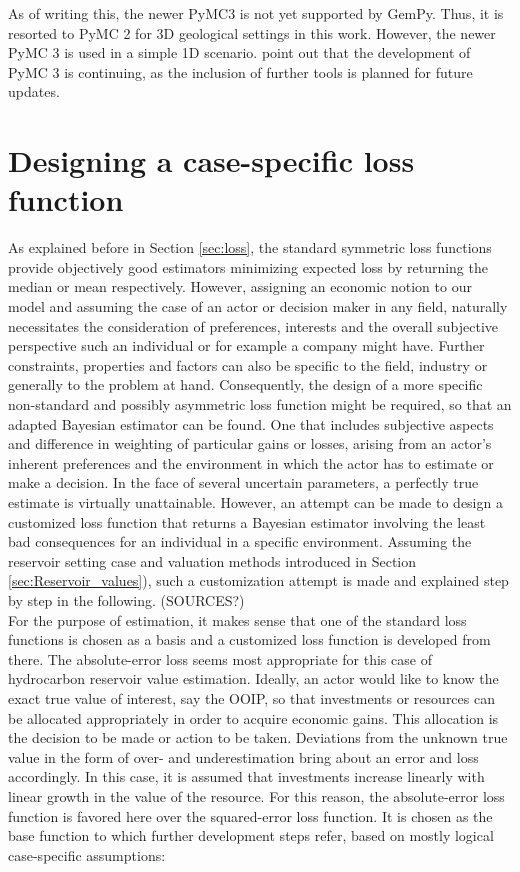 		As of writing this, the newer PyMC3 is not yet supported by GemPy. Thus, it is resorted to PyMC 2 for 3D geological settings in this work. However, the newer PyMC 3 is used in a simple 1D scenario. \citet{salvatier2016pymc3} point out that the development of PyMC 3 is continuing, as the inclusion of further tools is planned for future updates.
		
		\section{Designing a case-specific loss function}\label{sec:LF_design}	
		As explained before in Section \ref{sec:loss}, the standard symmetric loss functions provide objectively good estimators minimizing expected loss by returning the median or mean respectively. However, assigning an economic notion to our model and assuming the case of an actor or decision maker in any field, naturally necessitates the consideration of preferences, interests and the overall subjective perspective such an individual or for example a company might have. Further constraints, properties and factors can also be specific to the field, industry or generally to the problem at hand. Consequently, the design of a more specific non-standard and possibly asymmetric loss function might be required, so that an adapted Bayesian estimator can be found. One that includes subjective aspects and difference in weighting of particular gains or losses, arising from an actor's inherent preferences and the environment in which the actor has to estimate or make a decision. In the face of several uncertain parameters, a perfectly true estimate is virtually unattainable. However, an attempt can be made to design a customized loss function that returns a Bayesian estimator involving the least bad consequences for an individual in a specific environment. Assuming the reservoir setting case and valuation methods introduced in Section \ref{sec:Reservoir_values}), such a customization attempt is made and explained step by step in the following. (SOURCES?)\\
		For the purpose of estimation, it makes sense that one of the standard loss functions is chosen as a basis and a customized loss function is developed from there. The absolute-error loss seems most appropriate for this case of hydrocarbon reservoir value estimation. Ideally, an actor would like to know the exact true value of interest, say the OOIP, so that investments or resources can be allocated appropriately in order to acquire economic gains. This allocation is the decision to be made or action to be taken. Deviations from the unknown true value in the form of over- and underestimation bring about an error and loss accordingly. In this case, it is assumed that investments increase linearly with linear growth in the value of the resource. For this reason, the absolute-error loss function is favored here over the squared-error loss function. It is chosen as the base function to which further development steps refer, based on mostly logical case-specific assumptions:
		
